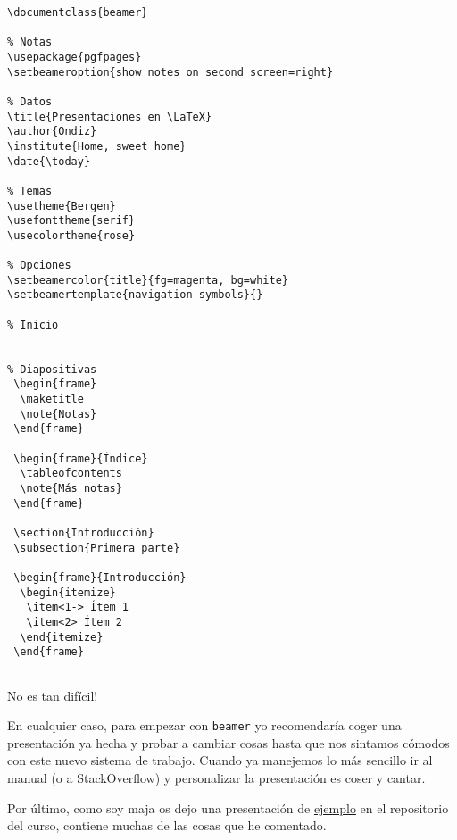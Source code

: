 \begin{lstlisting}[language={[latex]tex}]
% Definición
\documentclass{beamer}

% Notas
\usepackage{pgfpages}
\setbeameroption{show notes on second screen=right}

% Datos
\title{Presentaciones en \LaTeX}
\author{Ondiz}
\institute{Home, sweet home}
\date{\today}

% Temas
\usetheme{Bergen}
\usefonttheme{serif}
\usecolortheme{rose}

% Opciones
\setbeamercolor{title}{fg=magenta, bg=white}
\setbeamertemplate{navigation symbols}{}

% Inicio


% Diapositivas
 \begin{frame}
  \maketitle
  \note{Notas}
 \end{frame}
 
 \begin{frame}{Índice}
  \tableofcontents
  \note{Más notas}
 \end{frame}
 
 \section{Introducción}
 \subsection{Primera parte}

 \begin{frame}{Introducción}
  \begin{itemize}
   \item<1-> Ítem 1
   \item<2> Ítem 2
  \end{itemize}
 \end{frame}


\end{lstlisting}

No es tan difícil!

En cualquier caso, para empezar con \lstinline!beamer! yo recomendaría
coger una presentación ya hecha y probar a cambiar cosas hasta que nos
sintamos cómodos con este nuevo sistema de trabajo. Cuando ya manejemos
lo más sencillo ir al manual (o a StackOverflow) y personalizar la
presentación es coser y cantar.

Por último, como soy maja os dejo una presentación de
\href{https://github.com/Ondiz/cursoLatex/tree/master/Ejemplos/Presentacion}{ejemplo}
en el repositorio del curso, contiene muchas de las cosas que he
comentado.

